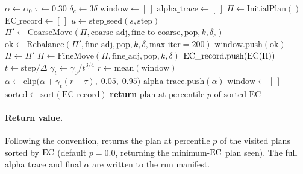 \begin{algorithm}[t]
\caption{\ams{}($\text{fine\_adj}$, $\text{coarse\_adj}$,
  $\text{fine\_to\_coarse}$, $\text{pop}$, $k$, $\delta$,
  $\tau$, $\alpha_0$, $\Delta$, $\gamma_0$, $T$, $s$, $p$)}
\label{alg:ams}
\begin{algorithmic}[1]
\State $\alpha \gets \alpha_0$ 
\State $\tau \gets 0.30$ 
\State $\delta_c \gets 3\delta$ 
\State $\mathrm{window} \gets [\,]$ 
\State $\mathrm{alpha\_trace} \gets [\,]$
\State $\Pi \gets \text{InitialPlan}()$
\State $\mathrm{EC\_record} \gets [\,]$ 
  \State $u \gets \text{step\_seed}(s, \text{step})$
    \State $\Pi' \gets \text{CoarseMove}(\Pi, \text{coarse\_adj}, \text{fine\_to\_coarse},
           \text{pop}, k, \delta_c)$
    \State $\text{ok} \gets \text{Rebalance}(\Pi', \text{fine\_adj}, \text{pop}, k, \delta,
           \text{max\_iter}=200)$
    \State $\mathrm{window}.\text{push}(\text{ok})$
      \State $\Pi \gets \Pi'$
    \EndIf
  \Else
    \State $\Pi \gets \text{FineMove}(\Pi, \text{fine\_adj}, \text{pop}, k, \delta)$
  \EndIf
  \State $\mathrm{EC\_record}.\text{push}(\mathrm{EC}(\Pi))$
    \State $t \gets \text{step} / \Delta$
    \State $\gamma_t \gets \gamma_0 / t^{3/4}$
    \State $r \gets \text{mean}(\mathrm{window})$
    \State $\alpha \gets \text{clip}\!\bigl(\alpha + \gamma_t(r - \tau),\; 0.05,\; 0.95\bigr)$
    \State $\mathrm{alpha\_trace}.\text{push}(\alpha)$
    \State $\mathrm{window} \gets [\,]$
  \EndIf
\EndFor
\State $\text{sorted} \gets \text{sort}(\mathrm{EC\_record})$
\State \textbf{return} $\text{plan at percentile } p \text{ of sorted EC}$
\end{algorithmic}
\end{algorithm}

\paragraph{Return value.}
Following the \ms{} convention, \ams{} returns the plan at percentile $p$ of
the visited plans sorted by $\mathrm{EC}$ (default $p = 0.0$, returning the
minimum-$\mathrm{EC}$ plan seen).
The full alpha trace and final $\alpha$ are written to the run manifest.

